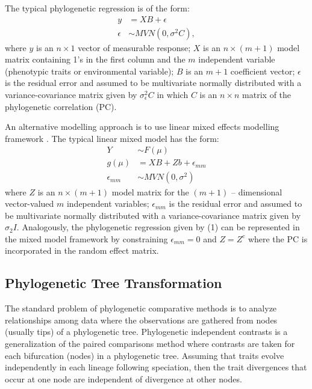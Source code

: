 The typical phylogenetic regression is of the form:
\begin{align}
y & = XB + \epsilon \\
\epsilon & \sim MVN(0,\sigma^{2}C),
\label{eq:gls}
\end{align}
where $y$ is an $n \times 1$ vector of measurable response; $X$ is an $n \times (m + 1)$ model matrix containing 1's in the first column and the $m$ independent variable (phenotypic traits or environmental variable); $B$ is an $m + 1$ coefficient vector; $\epsilon$ is the residual error and assumed to be multivariate normally distributed with a variance-covariance matrix given by $\sigma^{2}_{\epsilon}C$ in which $C$ is an $n \times n$ matrix of the phylogenetic correlation (PC).

An alternative modelling approach is to use linear mixed effects modelling framework \citep{lynch1991methods}.
The typical linear mixed model has the form:
\begin{align}
Y & \sim F(\mu) \\
g(\mu) & = XB + Zb + \epsilon_{mm} \\
\epsilon_{mm} & \sim MVN(0,\sigma^2)
\end{align}
where $Z$ is an $n \times (m+1)$ model matrix for the $(m+1)$ -- dimensional vector-valued $m$ independent variables; $\epsilon_{mm}$ is the residual error and assumed to be multivariate normally distributed with a variance-covariance matrix given by $\sigma_{2}I$.
Analogously, the phylogenetic regression given by (1) can be represented in the mixed model framework by constraining $\epsilon_{mm} = 0$ and $Z=Z^{c}$ where the PC is incorporated in the random effect matrix. 

\subsection{Phylogenetic Tree Transformation}
The standard problem of phylogenetic comparative methods is to analyze relationships among data where the observations are gathered from nodes (usually tips) of a phylogenetic tree.
Phylogenetic independent contrasts is a generalization of the paired comparisons method where contrasts are taken for each bifurcation (nodes) in a phylogenetic tree. 
Assuming that traits evolve independently in each lineage following speciation, then the trait divergences that occur at one node are independent of divergence at other nodes.  

